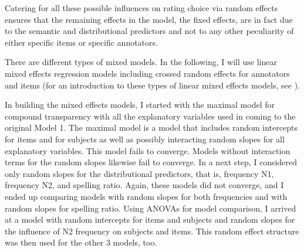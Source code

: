 Catering for all these possible influences on rating choice via random
effects ensures that the remaining effects in the model, the fixed
effects, are in fact due to the semantic and distributional predictors
and not to any other peculiarity of either specific items or specific annotators. 


There are different types of mixed models. In the following, I will
use linear mixed effects regression models including crossed
random effects for annotators and items (for an introduction to these types
of linear mixed effects models, see \citealt{Baayenetal:2008}). 



In building the mixed effects models, I started with the maximal model
for compound transparency
with all the explanatory variables used in coming to the original
Model 1. The maximal model is a model that includes random intercepts for items and for
subjects as well as possibly interacting random slopes for all
explanatory variables. This model fails to converge. Models without
interaction terms for the random slopes likewise fail to converge. In
a next step, I considered only random slopes for the distributional
predictors, that is, frequency N1, frequency N2, and spelling
ratio. Again, these models did not converge, and I ended up comparing
models with random slopes for both frequencies and with random slopes
for spelling ratio. Using ANOVAs for model comparison, I arrived at
a model with random intercepts for items and subjects and random
slopes for the influence of N2 frequency on subjects and items. This
random effect structure was then used for the other 3 models, too.

